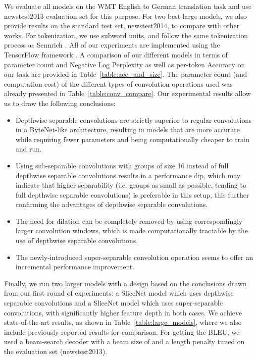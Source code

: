 \documentclass{article}
\begin{document}
We evaluate all models on the WMT English to German translation task and use newstest2013 evaluation set for this purpose.
For two best large models, we also provide results on the standard test set, newstest2014, to compare with other works.
For tokenization, we use subword units, and follow the same tokenization process as Sennrich \cite{SennrichHB15}.
All of our experiments are implemented using the TensorFlow framework \cite{tensorflow}.
A comparison of our different models in terms of parameter count and Negative Log Perplexity
as well as per-token Accuracy on our task are provided in Table~\ref{table:acc_and_size}.
The parameter count (and computation cost) of the different types of convolution operations used
was already presented in Table~\ref{table:conv_compare}.
Our experimental results allow us to draw the following conclusions:

\begin{itemize}
    \item Depthwise separable convolutions are strictly superior to regular convolutions in a ByteNet-like architecture, resulting in models that are more accurate while requiring fewer parameters and being computationally cheaper to train and run.
    \item Using sub-separable convolutions with groups of size 16 instead of full depthwise separable convolutions results in a performance dip, which may indicate that higher separability (i.e. groups as small as possible, tending to full depthwise separable convolutions) is preferable in this setup, this further confirming the advantages of depthwise separable convolutions.
    \item The need for dilation can be completely removed by using correspondingly larger convolution windows, which is made computationally tractable by the use of depthwise separable convolutions.
    \item The newly-introduced super-separable convolution operation seems to offer an incremental performance improvement.
\end{itemize}

Finally, we run two larger models with a design based on the conclusions drawn from our first round of experiments: a SliceNet model which uses depthwise separable convolutions and a SliceNet model which uses super-separable convolutions, with significantly higher feature depth in both cases. We achieve state-of-the-art results, as shown in Table~\ref{table:large_models}, where we also include
previously reported results for comparison. For getting the BLEU, we used a beam-search decoder with a beam size of  and
a length penalty tuned on the evaluation set (newstest2013).
\end{document}
